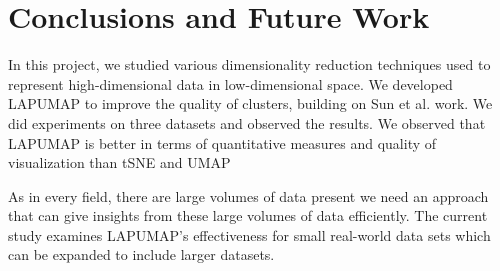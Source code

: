 \chapter{Conclusions and Future Work}

In this project, we studied various dimensionality reduction techniques used to represent high-dimensional data in low-dimensional space. We developed LAPUMAP to improve the quality of clusters, building on Sun et al. \cite{sun2023laplacian} work. We did experiments on three datasets and observed the results. We observed that LAPUMAP is better in terms of quantitative measures and quality of visualization than tSNE and UMAP\par
As in every field, there are large volumes of data present we need an approach that can give insights from these large volumes of data efficiently.
The current study examines LAPUMAP's effectiveness for small real-world data sets which can be expanded to include larger datasets.